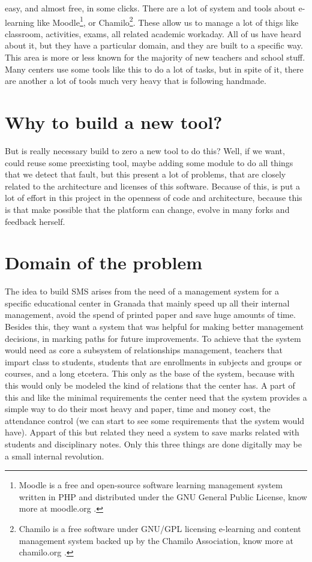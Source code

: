 easy, and almost free, in some clicks. There are a lot of system and
tools about e-learning like Moodle\footnote{Moodle is a free and open-source
software learning management system written in PHP and distributed under the GNU
General Public License, know more at moodle.org .},
 or Chamilo\footnote{Chamilo is a free software
under GNU/GPL licensing e-learning and content management system backed up by
the Chamilo Association, know more at chamilo.org .}.
These allow us to manage
a lot of thigs like classroom, activities, exams, all related academic workaday.
All of us have heard about it, but they have a particular domain, and they are built to a specific way.
\intro
This area is more or less known for the majority of new teachers
and school stuff. Many centers use some tools like this to do a lot
of tasks, but in spite of it, there are another a lot of tools much
very heavy that is following handmade.

\section{Why to build a new tool?}

But is really necessary build to zero a new tool to do this?  Well,
if we want, could reuse some preexisting tool, maybe adding some module
to do all things that we detect that fault, but this present a lot
of problems, that are closely related to the architecture and licenses
of this software.
\intro
Because of this, is put a lot of effort in this
project in the openness of code and architecture, because this is that
make possible that the platform can  change, evolve in many
forks and feedback herself.

\section{Domain of the problem}

The idea to build SMS arises from the need of a management system for
a specific educational center in Granada that mainly speed up all
their internal management, avoid the spend of printed paper and save
huge amounts of time.
\intro
Besides this, they want a system that was helpful
for making better management decisions, in marking paths for future
improvements. To achieve that the system would need as core
a subsystem of relationships management, teachers that impart class
to students, students that are enrollments in subjects and groups
or courses, and a long etcetera. This only as the base of the system,
because with this would only be modeled the kind of relations that
the center has.
\intro
A part of this and like the minimal requirements
the center need that the system provides a simple way to do their most
heavy and paper, time and money cost, the attendance control (we can start to see
some requirements that the system would have). Appart of this but related they need
a system to save marks related with students and disciplinary notes. Only this three
things are done digitally may be a small internal revolution.


